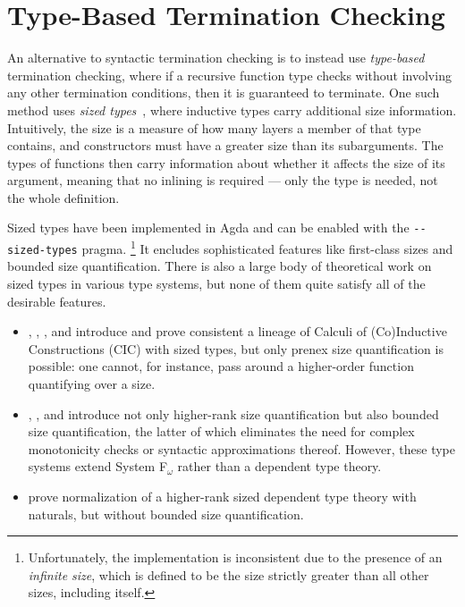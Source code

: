\documentclass[acmsmall,nonacm, screen]{acmart}
\begin{document}
\section{Type-Based Termination Checking}

An alternative to syntactic termination checking is to instead use \emph{type-based} termination checking,
where if a recursive function type checks without involving any other termination conditions,
then it is guaranteed to terminate.
One such method uses \emph{sized types}~\citep{hughes}, where inductive types carry additional size information.
Intuitively, the size is a measure of how many layers a member of that type contains,
and constructors must have a greater size than its subarguments.
The types of functions then carry information about whether it affects the size of its argument,
meaning that no inlining is required --- only the type is needed, not the whole definition.

Sized types have been implemented in Agda and can be enabled with the \texttt{-\hspace{0em}-sized-types} pragma.%
\footnote{Unfortunately, the implementation is inconsistent due to the presence of an \emph{infinite size},
which is defined to be the size strictly greater than all other sizes, including itself.}
It encludes sophisticated features like first-class sizes and bounded size quantification.
There is also a large body of theoretical work on sized types in various type systems,
but none of them quite satisfy all of the desirable features.

\begin{itemize}
  \item \citet{cic-hat}, \citet{cic-hat-minus-nat}, \citet{cic-hat-minus}, and \citet{cc-hat-omega}
    introduce and prove consistent a lineage of Calculi of (Co)Inductive Constructions (CIC) with sized types,
    but only prenex size quantification is possible: one cannot, for instance,
    pass around a higher-order function quantifying over a size.
  \item \citet{abel-diss}, \citet{flationary}, and \citet{f-omega-cop}
    introduce not only higher-rank size quantification but also bounded size quantification,
    the latter of which eliminates the need for complex monotonicity checks or syntactic approximations thereof.
    However, these type systems extend System F$_{\omega}$ rather than a dependent type theory.
  \item \citet{nbe-sized} prove normalization of a higher-rank sized dependent type theory with naturals,
    but without bounded size quantification.
\end{itemize}
\end{document}
